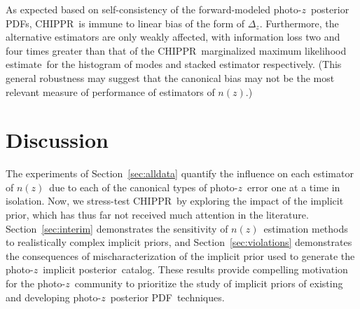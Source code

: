 \documentclass[iop]{emulateapj}
\newcommand{\todo}[3]{{\color{#2}\emph{#1}: #3}}
\newcommand{\que}[1]{\todo{Question}{cyan}{#1}}
\newcommand{\Sect}[1]{Section~\ref{#1}}
\newcommand{\project}[1]{\textsc{#1}}
\newcommand{\Chippr}{\project{CHIPPR}}%
\newcommand{\pz}{photo-$z$}
\newcommand{\pzpdf}{\pz\ posterior PDF}%
\newcommand{\pzip}{\pz\ implicit posterior}
\newcommand{\nz}{$n(z)$}
\newcommand{\mmle}{marginalized maximum likelihood estimate}%
\begin{document}
As expected based on self-consistency of the forward-modeled \pzpdf s, \Chippr\ is immune to linear bias of the form of $\Delta_{z}$.
Furthermore, the alternative estimators are only weakly affected, with information loss two and four times greater than that of the \Chippr\ \mmle\ for the histogram of modes and stacked estimator respectively.
(This general robustness may suggest that the canonical bias may not be the most relevant measure of performance of estimators of \nz.)

\section{Discussion}
\label{sec:results}

The experiments of \Sect{sec:alldata} quantify the influence on each estimator of \nz\ due to each of the canonical types of \pz\ error one at a time in isolation.
Now, we stress-test \Chippr\ by exploring the impact of the implicit prior, which has thus far not received much attention in the literature.
\Sect{sec:interim} demonstrates the sensitivity of \nz\ estimation methods to realistically complex implicit priors, and \Sect{sec:violations} demonstrates the consequences of mischaracterization of the implicit prior used to generate the \pzip\ catalog.
These results provide compelling motivation for the \pz\ community to prioritize the study of implicit priors of existing and developing \pzpdf\ techniques.

\end{document}
